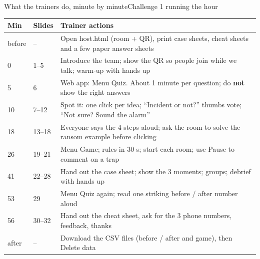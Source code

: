 \documentclass[aspectratio=169,11pt,t]{beamer}
\newcommand\file[1]{{\ttfamily\color{navy}#1}}
\begin{document}
\begin{frame}{What the trainers do, minute by minute}{Challenge 1 \textbullet{} running the hour}
  \vspace{0mm}
  \begin{card}[left=3mm, right=3mm, top=1.5mm, bottom=1mm]
    \fontsize{7}{8.4}\selectfont\setlength\tabcolsep{3pt}\renewcommand{\arraystretch}{1.1}
    \begin{tabular}{@{}L{9mm}L{11mm}L{106mm}@{}}
      \textcolor{muted}{Min} & \textcolor{muted}{Slides} & \textcolor{muted}{Trainer actions}\\\midrule
      before & -- & Open \file{host.html} (room + QR), print case sheets, cheat sheets and a few paper answer sheets\\
      0 & 1--5 & Introduce the team; show the QR so people join while we talk; warm-up with hands up\\
      5 & 6 & Web app: Menu \textrightarrow{} Quiz. About 1 minute per question; do \textbf{not} show the right answers\\
      10 & 7--12 & Spot it: one click per idea; ``Incident or not?'' thumbs vote; ``Not sure? Sound the alarm''\\
      18 & 13--18 & Everyone says the 4 steps aloud; ask the room to solve the ransom example before clicking\\
      26 & 19--21 & Menu \textrightarrow{} Game; rules in 30 s; start each room; use Pause to comment on a trap\\
      41 & 22--28 & Hand out the case sheet; show the 3 moments; groups; debrief with hands up\\
      53 & 29 & Menu \textrightarrow{} Quiz again; read one striking before / after number aloud\\
      56 & 30--32 & Hand out the cheat sheet, ask for the 3 phone numbers, feedback, thanks\\
      after & -- & Download the CSV files (before / after and game), then Delete data\\
    \end{tabular}
  \end{card}
\end{frame}
\end{document}
